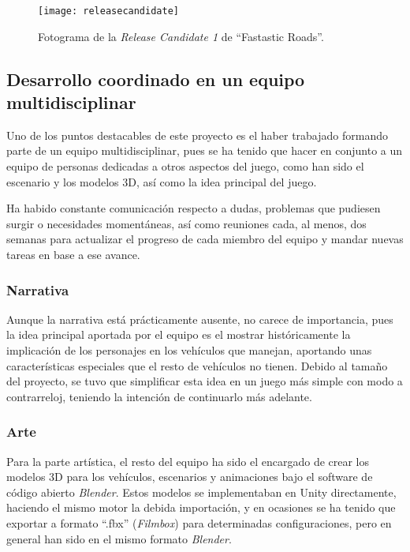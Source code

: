 \begin{figure}[h]
	\centering
	\texttt{[image: releasecandidate]}
	\caption{Fotograma de la \textit{Release Candidate 1} de ``Fastastic Roads''.}
	\label{fig:releasecandidate}
\end{figure}

\subsection{Desarrollo coordinado en un equipo multidisciplinar}

Uno de los puntos destacables de este proyecto es el haber trabajado formando parte de un equipo multidisciplinar, pues se ha tenido que hacer en conjunto a un equipo de personas dedicadas a otros aspectos del juego, como han sido el escenario y los modelos 3D, así como la idea principal del juego.

Ha habido constante comunicación respecto a dudas, problemas que pudiesen surgir o necesidades momentáneas, así como reuniones cada, al menos, dos semanas para actualizar el progreso de cada miembro del equipo y mandar nuevas tareas en base a ese avance.

\subsubsection{Narrativa}

Aunque la narrativa está prácticamente ausente, no carece de importancia, pues la idea principal aportada por el equipo es el mostrar históricamente la implicación de los personajes en los vehículos que manejan, aportando unas características especiales que el resto de vehículos no tienen. Debido al tamaño del proyecto, se tuvo que simplificar esta idea en un juego más simple con modo a contrarreloj, teniendo la intención de continuarlo más adelante.

\subsubsection{Arte}

Para la parte artística, el resto del equipo ha sido el encargado de crear los modelos 3D para los vehículos, escenarios y animaciones bajo el software de código abierto \textit{Blender}. Estos modelos se implementaban en Unity directamente, haciendo el mismo motor la debida importación, y en ocasiones se ha tenido que exportar a formato ``.fbx'' (\textit{Filmbox}) para determinadas configuraciones, pero en general han sido en el mismo formato \textit{Blender}.

